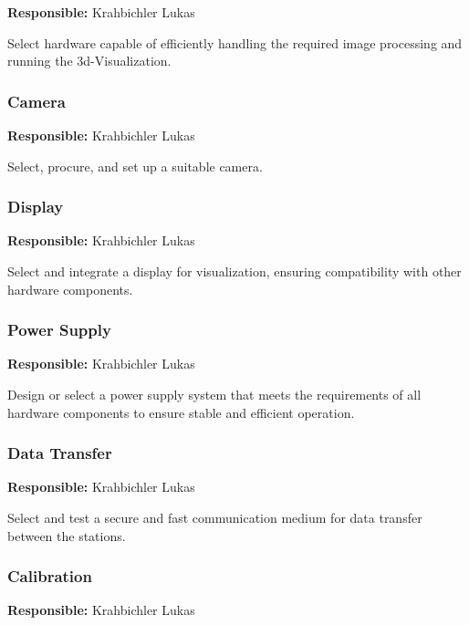 \textbf{Responsible:} Krahbichler Lukas

Select hardware capable of efficiently handling the required image processing and running the \acrfull{3d}-Visualization.

\subsubsection{Camera} %

\textbf{Responsible:} Krahbichler Lukas

Select, procure, and set up a suitable camera.

\subsubsection{Display} %

\textbf{Responsible:} Krahbichler Lukas

Select and integrate a display for visualization, ensuring compatibility with other hardware components.

\subsubsection{Power Supply}

\textbf{Responsible:} Krahbichler Lukas

Design or select a power supply system that meets the requirements of all hardware components to ensure stable and efficient operation.

\subsubsection{Data Transfer}

\textbf{Responsible:} Krahbichler Lukas

Select and test a secure and fast communication medium for data transfer between the stations.

\subsubsection{Calibration}

\textbf{Responsible:} Krahbichler Lukas

